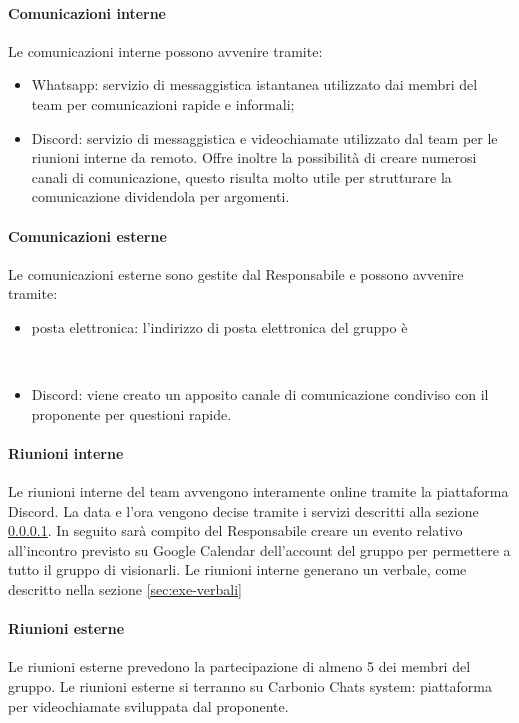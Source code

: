     \paragraph{Comunicazioni interne} \label{sec:com-interne}
    Le comunicazioni interne possono avvenire tramite:
        \begin{itemize}
            \item Whatsapp: servizio di messaggistica istantanea utilizzato dai membri del team per comunicazioni rapide e informali;
            \item Discord: servizio di messaggistica e videochiamate utilizzato dal team per le riunioni interne da remoto. Offre inoltre la possibilità di creare numerosi canali di comunicazione, questo risulta molto utile per strutturare la comunicazione dividendola per argomenti.  
        \end{itemize}

    \paragraph{Comunicazioni esterne}
    Le comunicazioni esterne sono gestite dal Responsabile e possono avvenire tramite:
    \begin{itemize}
        \item posta elettronica: l'indirizzo di posta elettronica del gruppo è
        \begin{center}
            \mailtoQBS\\[0.3cm]
        \end{center} 
        \item Discord: viene creato un apposito canale di comunicazione condiviso con il proponente per questioni rapide.
    \end{itemize}

    \paragraph{Riunioni interne}
    Le riunioni interne del team avvengono interamente online tramite la piattaforma Discord. La data e l'ora vengono decise tramite i servizi descritti alla sezione \ref{sec:com-interne}. In seguito sarà compito del Responsabile creare un evento relativo all'incontro previsto su Google Calendar dell'account del gruppo per permettere a tutto il gruppo di visionarli.
    Le riunioni interne generano un verbale, come descritto nella sezione \ref{sec:exe-verbali}

    \paragraph{Riunioni esterne}
    Le riunioni esterne prevedono la partecipazione di almeno 5 dei membri del gruppo. Le riunioni esterne si terranno su Carbonio Chats system: piattaforma per videochiamate sviluppata dal proponente.

